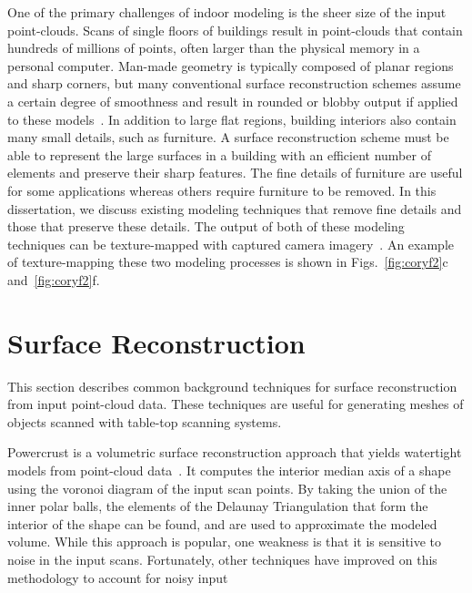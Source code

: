 \documentclass[12pt,onecolumn,oneside]{book}
\begin{document}
One of the primary challenges of indoor modeling is the sheer size of the input point-clouds.  Scans of single floors of buildings result in point-clouds that contain hundreds of millions of points, often larger than the physical memory in a personal computer.  Man-made geometry is typically composed of planar regions and sharp corners, but many conventional surface reconstruction schemes assume a certain degree of smoothness and result in rounded or blobby output if applied to these models~\cite{Powercrust,OctreeSculpting,Carving,ProgressiveMesh,Poisson,EigencrustShewchuk}.  In addition to large flat regions, building interiors also contain many small details, such as furniture.  A surface reconstruction scheme must be able to represent the large surfaces in a building with an efficient number of elements and preserve their sharp features.  The fine details of furniture are useful for some applications whereas others require furniture to be removed.  In this dissertation, we discuss existing modeling techniques that remove fine details and those that preserve these details.  The output of both of these modeling techniques can be texture-mapped with captured camera imagery~\cite{Cheng14}.  An example of texture-mapping these two modeling processes is shown in Figs.~\ref{fig:coryf2}c and~\ref{fig:coryf2}f.

\section{Surface Reconstruction}
\label{sec:surf_recon_background}

This section describes common background techniques for surface reconstruction from input point-cloud data.  These techniques are useful for generating meshes of objects scanned with table-top scanning systems.

Powercrust is a volumetric surface reconstruction approach that yields watertight models from point-cloud data~\cite{Powercrust}.  It computes the interior median axis of a shape using the voronoi diagram of the input scan points.  By taking the union of the inner polar balls, the elements of the Delaunay Triangulation that form the interior of the shape can be found, and are used to approximate the modeled volume.  While this approach is popular, one weakness is that it is sensitive to noise in the input scans.  Fortunately, other techniques have improved on this methodology to account for noisy input
\end{document}
